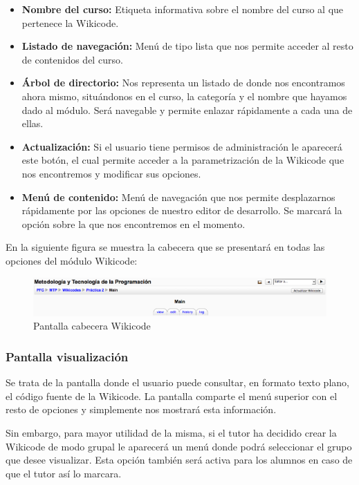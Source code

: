 \begin{itemize}
	\item \textbf{Nombre del curso:} Etiqueta informativa sobre el nombre del curso al que pertenece la Wikicode.
	\item \textbf{Listado de navegación:} Menú de tipo lista que nos permite acceder al resto de contenidos del curso.
	\item \textbf{Árbol de directorio:} Nos representa un listado de donde nos encontramos ahora mismo, situándonos en el curso, la categoría y el nombre que hayamos dado al módulo. Será navegable y permite enlazar rápidamente a cada una de ellas.
	\item \textbf{Actualización:} Si el usuario tiene permisos de administración le aparecerá este botón, el cual permite acceder a la parametrización de la Wikicode que nos encontremos y modificar sus opciones.
	\item \textbf{Menú de contenido:} Menú de navegación que nos permite desplazarnos rápidamente por las opciones de nuestro editor de desarrollo. Se marcará la opción sobre la que nos encontremos en el momento.
\end{itemize}

En la siguiente figura se muestra la cabecera que se presentará en todas las opciones del módulo Wikicode:

\begin{figure}[h]
	\centering
	\includegraphics[width=\textwidth]{./img/c4menu.eps}
	\caption{Pantalla cabecera Wikicode}
\end{figure}

\newpage

\subsubsection{Pantalla visualización}

Se trata de la pantalla donde el usuario puede consultar, en formato texto plano, el código fuente de la Wikicode. La pantalla comparte el menú superior con el resto de opciones y simplemente nos mostrará esta información.

Sin embargo, para mayor utilidad de la misma, si el tutor ha decidido crear la Wikicode de modo grupal le aparecerá un menú donde podrá seleccionar el grupo que desee visualizar. Esta opción también será activa para los alumnos en caso de que el tutor así lo marcara.

